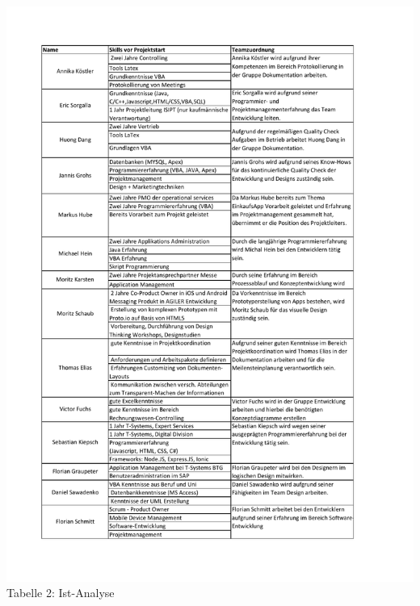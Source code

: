 \documentclass[12pt,a4paper]{article}
\begin{document}
\hspace*{-10mm} \includegraphics[trim = 15mm 0mm 0mm 20mm,clip,scale=0.8]{Skillliste.pdf}
\footnotesize Tabelle 2: Ist-Analyse
\\
\normalsize
\linebreak
\\
\end{document}
